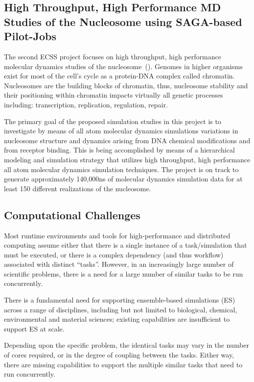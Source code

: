 \documentclass{sig-alternate}
\begin{document}
\subsection{High Throughput, High Performance MD Studies of the Nucleosome
using SAGA-based Pilot-Jobs}
The second ECSS project focuses on high throughput, high performance molecular
dynamics studies of the nucleosome~(\cite{TomBishop}). Genomes in higher
organisms
exist for most of the cell's cycle as a protein-DNA complex called chromatin.
Nucleosomes are the building blocks of chromatin, thus, nucleosome stability and
their positioning within chromatin impacts virtually all genetic processes
including: transcription, replication, regulation, repair.

The primary goal of the proposed simulation studies in this project is to
investigate by means of all atom molecular dynamics simulations variations in
nucleosome structure and dynamics arising from DNA chemical modifications and
from receptor binding. This is being accomplished by means of a hierarchical
modeling and simulation strategy that utilizes high throughput, high
performance all atom molecular dynamics simulation techniques. The project is
on track to generate approximately 140,000ns of molecular dynamics simulation
data for at least 150 different realizations of the nucleosome.


\subsection{Computational Challenges}

Most runtime environments and tools for high-performance and
distributed computing assume either that there is a single instance of
a task/simulation that must be executed, or there is a complex
dependency (and thus workflow) associated with distinct ``tasks''.
However, in an increasingly large number of scientific problems, there
is a need for a large number of similar tasks to be run concurrently.

There is a fundamental need for supporting ensemble-based simulations
(ES) across a range of disciplines, including but not limited to
biological, chemical, environmental and material sciences; existing
capabilities are insufficient to support ES at scale. 

Depending upon the specific problem, the identical tasks may vary in
the number of cores required, or in the degree of coupling between the
tasks.  Either way, there are missing capabilities to support the
multiple similar tasks that need to run concurrently.
\end{document}
